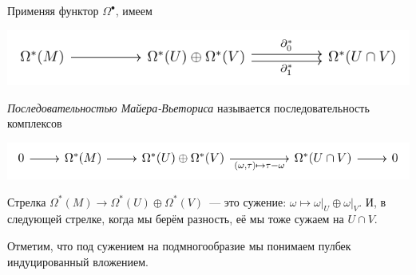  	  Применяя функтор $\Omega^{\bullet}$, имеем 
 	  \begin{center}
 	  	\includegraphics{lectures/7/pictures/cd_5.pdf}
 	  \end{center}

 	  \emph{Последовательностью Майера-Вьеториса} называется последовательность комплексов 
 	  \begin{center}
 	  		\includegraphics{lectures/7/pictures/cd_6.pdf}
 	  \end{center}

 	  \begin{remark}
 	  	Стрелка $\Omega^*(M) \to \Omega^*(U) \oplus \Omega^*(V)$~--- это сужение: $\omega \mapsto \omega\vert_U \oplus \omega\vert_{V}$. И, в следующей стрелке, когда мы берём разность, её мы тоже сужаем на $U \cap V$. 

 	  	Отметим, что под сужением на подмногообразие мы понимаем пулбек индуцированный вложением. 
 	  \end{remark}

